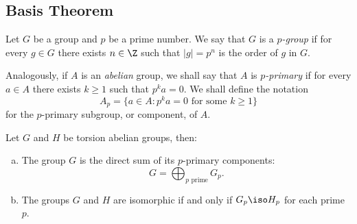 \subsection{Basis Theorem}

\begin{definition}[\(p\)-group]
\label{def:p-group}
Let \(G\) be a group and \(p\) be a prime number. We say that \(G\) is a
\emph{\(p\)-group} if for every \(g \in G\) there exists \(n \in \Z\) such that
\(|g| = p^n\) is the order of \(g\) in \(G\).

Analogously, if \(A\) is an \emph{abelian} group, we shall say that \(A\) is
\emph{\(p\)-primary} if for every \(a \in A\) there exists \(k \geq 1\) such
that \(p^k a = 0\). We shall define the notation
\[
A_p = \{a \in A \colon p^k a = 0 \text{ for some } k \geq 1\}
\]
for the \(p\)-primary subgroup, or component, of \(A\).
\end{definition}

\begin{theorem}
\label{thm:primary-decomposition-torsion-abelian-grp}
Let \(G\) and \(H\) be torsion abelian groups, then:
\begin{enumerate}[(a)]\setlength\itemsep{0em}
\item The group \(G\) is the direct sum of its \(p\)-primary components:
  \[
  G = \bigoplus_{p \text{ prime}} G_p.
  \]

\item The groups \(G\) and \(H\) are isomorphic if and only if \(G_p \iso H_p\)
  for each prime \(p\).
\end{enumerate}
\end{theorem}

